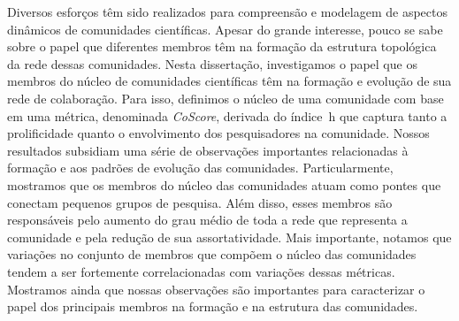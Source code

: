 Diversos esforços têm sido realizados para compreensão e modelagem de
aspectos dinâmicos de comunidades científicas. Apesar do grande interesse, pouco se sabe
sobre o papel que diferentes membros têm na formação da estrutura topológica da rede 
dessas comunidades. Nesta dissertação, investigamos o papel 
que os membros do núcleo de comunidades científicas têm na formação e evolução de sua rede de 
colaboração. Para isso, definimos o núcleo de uma comunidade com base em uma 
métrica, denominada \textit{CoScore}, derivada do índice~h que captura 
tanto a prolificidade quanto o envolvimento dos pesquisadores na comunidade. 
Nossos resultados subsidiam uma série de observações importantes relacionadas à 
formação e aos padrões de evolução das comunidades. Particularmente, mostramos que os membros 
do núcleo das comunidades atuam como pontes que conectam pequenos grupos de pesquisa. 
Além disso, esses membros são responsáveis pelo aumento do grau médio de toda a rede
que representa a comunidade e pela redução de sua assortatividade. Mais importante, 
notamos que variações no conjunto de membros que compõem o núcleo das comunidades tendem a ser fortemente 
correlacionadas com variações dessas métricas. Mostramos ainda que nossas observações 
são importantes para caracterizar o papel dos principais membros na formação e na estrutura das comunidades.



